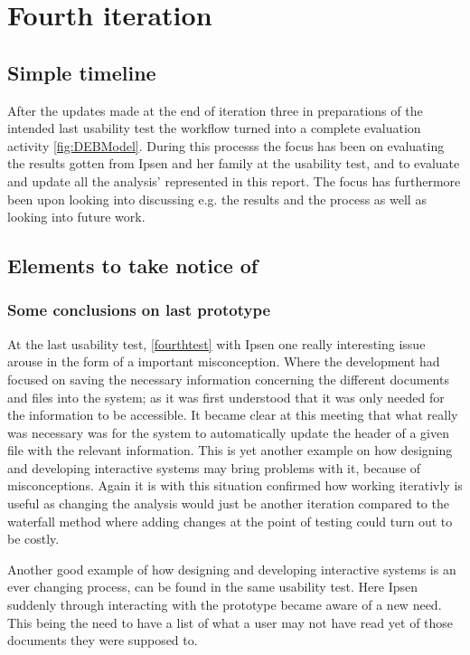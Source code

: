\section{Fourth iteration}
\subsection{Simple timeline}\label{sec:3Iteration-timeline}
After the updates made at the end of iteration three in preparations of the intended last usability test the workflow turned into a complete evaluation activity \cref{fig:DEBModel}.
During this processs the focus has been on evaluating the results gotten from Ipsen and her family at the usability test, and to evaluate and update all the analysis' represented in this report.
The focus has furthermore been upon looking into discussing e.g. the results and the process as well as looking into future work. 

\subsection{Elements to take notice of}
\subsubsection*{Some conclusions on last prototype}
At the last usability test, \cref{fourthtest}  with Ipsen one really interesting issue arouse in the form of a important misconception.
Where the development had focused on saving the necessary information concerning the different documents and files into the system; as it was first understood that it was only needed for the information to be accessible.
It became clear at this meeting that what really was necessary was for the system to automatically update the header of a given file  with the relevant information.
This is yet another example on how designing and developing interactive systems may bring problems with it, because of misconceptions.
Again it is with this situation confirmed how working iterativly is useful as changing the analysis would just be another iteration compared to the waterfall method where adding changes at the point of testing could turn out to be costly.

Another good example of how designing and developing interactive systems is an ever changing process, can be found in the same usability test.
Here Ipsen suddenly through interacting with the prototype became aware of a new need.
This being the need to have a list of what a user may not have read yet of those documents they were supposed to.